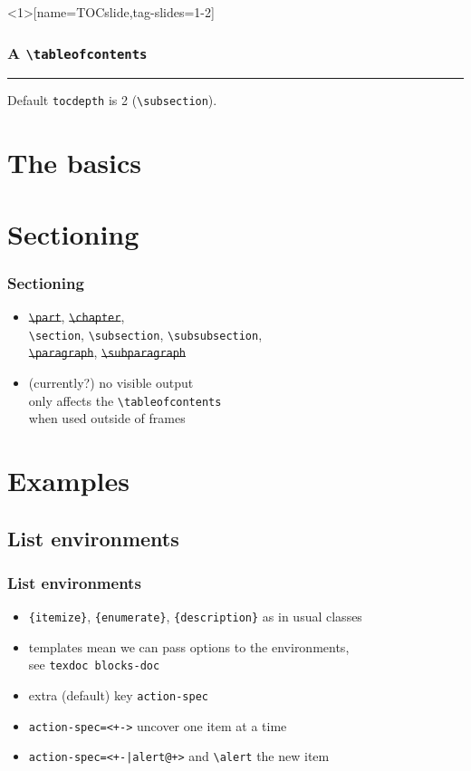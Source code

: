 \documentclass{ltx-talk}
\newcommand{\cs}[1]{\texttt{\textbackslash #1}}
\newcommand{\tubbraced}[1]{\texttt{\{#1\}}}
\begin{document}
\begin{frame}<1>[name=TOCslide,tag-slides=1-2]
\frametitle{A \cs{tableofcontents}\only<2>{ in a \cs{section}}}
\tableofcontents
\hrule\bigskip
Default \texttt{tocdepth} is 2 (\cs{subsection}).
\end{frame}

\section{The basics}

\section{Sectioning}


\begin{frame}
\frametitle{Sectioning}
\begin{itemize}
\item \sout{\cs{part}}, \sout{\cs{chapter}},\\
\cs{section}, \cs{subsection}, \cs{subsubsection},\\
\sout{\cs{paragraph}}, \sout{\cs{subparagraph}}
\item (currently?) no visible output\\
\qquad only affects the \cs{tableofcontents}\\
\qquad when used outside of frames
\end{itemize}
\end{frame}

\section{Examples}

\subsection{List environments}

\begin{frame*}
\frametitle{List environments}
\begin{itemize}
\item \tubbraced{itemize}, \tubbraced{enumerate}, \tubbraced{description}
as in usual classes
\item templates mean we can pass options to the environments,\\
see \texttt{texdoc blocks-doc}
\item extra (default) key \texttt{action-spec}
\item \verb!action-spec=<+->! \qquad uncover one item at a time
\item \verb!action-spec=<+-|alert@+>!
\qquad and \alert{\cs{alert}} the new item
\end{itemize}
\end{frame*}
\end{document}
